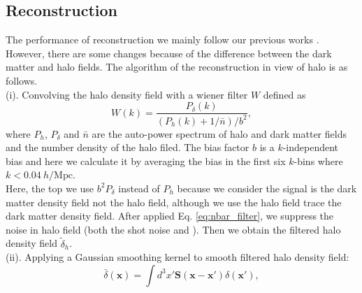 \subsection{Reconstruction}
The performance of reconstruction we mainly follow our previous works \citep{2012:pen,2015:zhu}. However, there are some changes because
of the difference between the dark matter and halo fields. The algorithm
of the reconstruction in view of halo is as follows.\\
(i). Convolving the halo density field with a wiener filter $W$ defined as 
\begin{equation}
W(k)=\frac{P_{\delta}(k)}{(P_{h}(k)+1/\bar{n})/b^2},
\label{eq:nbar_filter}
\end{equation}
where $P_{h}$, $P_{\delta}$ and $\bar{n}$ are the auto-power spectrum of 
halo and 
dark matter fields and the number density of the halo filed. The bias
factor $b$ is a $k$-independent bias and here we calculate it by
averaging the bias in the first six $k$-bins where $k<0.04\ h/\mathrm{Mpc}$.\\
 Here, the top
we use $b^2P_{\delta}$ instead of $P_{h}$ because we consider the signal
is the dark matter density field not the halo field, although we use the halo
 field trace the dark matter density field. After applied 
 Eq. \eqref{eq:nbar_filter}, we
 suppress the noise in halo field (both the shot noise {\color{black} and} ).  
Then we obtain the filtered halo density field $\tilde{\delta}_{h}$.\\
(ii). Applying a Gaussian smoothing kernel to smooth filtered halo 
density field:
\begin{equation}
\bar{\delta}(\mathbf{x})=\int d^{3}x'\mathbf{S}(\mathbf{x}-\mathbf{x}')\delta	(\mathbf{x}'),
\label{equ:smooth kernel}
\end{equation}
